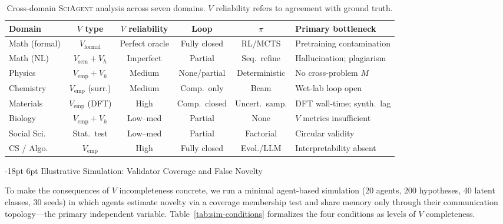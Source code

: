 \documentclass[11pt]{article}
\makeatletter
\renewcommand\section{\@startsection{section}{1}{\z@}%
  {-18pt \@plus -4pt \@minus -2pt}%
  {6pt \@plus 2pt}%
  {\normalfont\large\bfseries}}
\newcommand{\framework}{\textsc{SciAgent}}
\makeatother
\begin{document}
\begin{table}[h]
\centering
\small
\setlength{\tabcolsep}{4pt}
\begin{tabular}{@{}lccccp{2.6cm}@{}}
\toprule
Domain & $V$ type & $V$ reliability & Loop & $\pi$ & Primary bottleneck \\
\midrule
Math (formal) & $V_\text{formal}$ & Perfect oracle & Fully closed & RL/MCTS  & Pretraining contamination \\
Math (NL) & $V_\text{sem}+V_h$ & Imperfect & Partial & Seq.\ refine & Hallucination; plagiarism \\
Physics & $V_\text{emp}+V_h$ & Medium & None/partial & Deterministic & No cross-problem $M$ \\
Chemistry & $V_\text{emp}$ (surr.) & Medium & Comp.\ only & Beam & Wet-lab loop open \\
Materials & $V_\text{emp}$ (DFT) & High & Comp.\ closed & Uncert.\ samp. & DFT wall-time; synth.\ lag \\
Biology & $V_\text{emp}+V_h$ & Low--med & Partial & None & $V$ metrics insufficient \\
Social Sci. & Stat.\ test & Low--med & Partial & Factorial & Circular validity \\
CS / Algo. & $V_\text{emp}$ & High & Fully closed & Evol./LLM & Interpretability absent \\
\bottomrule
\end{tabular}
\caption{Cross-domain \framework{} analysis across seven domains. $V$ reliability refers to agreement with ground truth.}
\label{tab:domain-comparison}
\end{table}

\section{Illustrative Simulation: Validator Coverage and False Novelty}
\label{sec:simulation}

To make the consequences of $V$ incompleteness concrete, we run a minimal agent-based simulation (20 agents, 200 hypotheses, 40 latent classes, 30 seeds) in which agents estimate novelty via a coverage membership test and share memory only through their communication topology---the primary independent variable. Table~\ref{tab:sim-conditions} formalizes the four conditions as levels of $V$ completeness.
\end{document}
